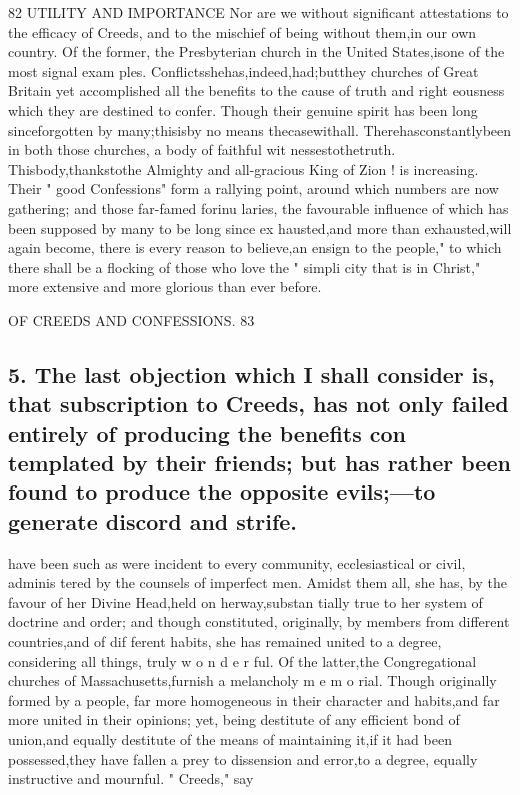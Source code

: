 \documentclass[
]{book}
\begin{document}
82 UTILITY AND IMPORTANCE
Nor are we without significant attestations to the efficacy of Creeds, and to the mischief
of being without them,in our own country. Of the former, the Presbyterian church in the United States,isone of the most signal exam ples. Conflictsshehas,indeed,had;butthey
churches of Great Britain yet accomplished
all the benefits to the cause of truth and right
eousness which they are destined to confer.
Though their genuine spirit has been long
sinceforgotten by many;thisisby no means thecasewithall. Therehasconstantlybeen
in both those churches, a body of faithful wit nessestothetruth. Thisbody,thankstothe Almighty and all-gracious King of Zion ! is increasing. Their " good Confessions" form a rallying point, around which numbers are now gathering; and those far-famed forinu laries, the favourable influence of which has been supposed by many to be long since ex
hausted,and more than exhausted,will again become, there is every reason to believe,an
ensign to the people," to which there shall be a flocking of those who love the " simpli city that is in Christ," more extensive and more glorious than ever before.

OF CREEDS AND CONFESSIONS. 83

\hypertarget{the-last-objection-which-i-shall-consider-is-that-subscription-to-creeds-has-not-only-failed-entirely-of-producing-the-benefits-con-templated-by-their-friends-but-has-rather-been-found-to-produce-the-opposite-evilsto-generate-discord-and-strife.}{%
\subsection{5. The last objection which I shall consider is, that subscription to Creeds, has not only failed entirely of producing the benefits con templated by their friends; but has rather been found to produce the opposite evils;---to generate discord and strife.}\label{the-last-objection-which-i-shall-consider-is-that-subscription-to-creeds-has-not-only-failed-entirely-of-producing-the-benefits-con-templated-by-their-friends-but-has-rather-been-found-to-produce-the-opposite-evilsto-generate-discord-and-strife.}}

have been such as were incident to every
community, ecclesiastical or civil, adminis
tered by the counsels of imperfect men.
Amidst them all, she has, by the favour of
her Divine Head,held on herway,substan
tially true to her system of doctrine and
order; and though constituted, originally, by
members from different countries,and of dif
ferent habits, she has remained united to a
degree, considering all things, truly w o n d e r
ful. Of the latter,the Congregational churches
of Massachusetts,furnish a melancholy m e m o
rial. Though originally formed by a people, far more homogeneous in their character and
habits,and far more united in their opinions; yet, being destitute of any efficient bond of
union,and equally destitute of the means of maintaining it,if it had been possessed,they have fallen a prey to dissension and error,to a degree, equally instructive and mournful.
" Creeds," say
\end{document}
